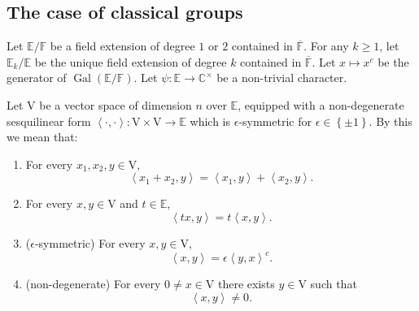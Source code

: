 \documentclass[12pt, reqno]{amsart}
\theoremstyle{definition}
\theoremstyle{definition}
\theoremstyle{definition}
\newcommand{\cComplex}{\mathbb{C}}
\newcommand{\multiplicativegroup}[1]{#1^{\times}}
\newcommand{\hermitianSpace}{\mathrm{V}}
\newcommand{\innerproduct}[2]{\left\langle #1,#2\right\rangle}
\newcommand{\fieldCharacter}{\psi}
\newcommand{\involution}[1]{#1^{c}}
\newcommand{\finiteField}{\mathbb{F}}
\newcommand{\quadraticExtension}{\mathbb{E}}
\newcommand{\quadraticFieldExtension}[1]{\quadraticExtension_{#1}}
\newcommand{\algebraicClosure}[1]{\overline{#1}}
\newcommand{\Galois}{\operatorname{Gal}}
\begin{document}
\subsection{The case of classical groups}

Let $\quadraticExtension \slash \finiteField$ be a field extension of degree $1$ or $2$ contained in $\algebraicClosure{\finiteField}$. For any $k \ge 1$, let $\quadraticFieldExtension{k} \slash \quadraticExtension$ be the unique field extension of degree $k$ contained in $\algebraicClosure{\finiteField}$. Let $x \mapsto \involution{x}$ be the generator of $\Galois\left(\quadraticExtension \slash \finiteField\right)$. Let $\fieldCharacter \colon \quadraticExtension \to \multiplicativegroup{\cComplex}$ be a non-trivial character.

Let $\hermitianSpace$ be a vector space of dimension $n$ over $\quadraticExtension$, equipped with a non-degenerate sesquilinear form $\innerproduct{\cdot}{\cdot} \colon \hermitianSpace \times \hermitianSpace \to \quadraticExtension$ which is $\epsilon$-symmetric for $\epsilon \in \left\{\pm 1\right\}$. By this we mean that:
\begin{enumerate}
	\item For every $x_1,x_2,y \in \hermitianSpace$, $$\innerproduct{x_1 + x_2}{y} = \innerproduct{x_1}{y} + \innerproduct{x_2}{y}.$$
	\item For every $x,y \in \hermitianSpace$ and $t \in \quadraticExtension$, $$\innerproduct{tx}{y} = t\innerproduct{x}{y}.$$
	\item ($\epsilon$-symmetric) For every $x,y \in \hermitianSpace$, $$\innerproduct{x}{y} = \epsilon \involution{\innerproduct{y}{x}}.$$
	\item (non-degenerate) For every $0 \ne x \in \hermitianSpace$ there exists $y \in \hermitianSpace$ such that $$\innerproduct{x}{y} \ne 0.$$
\end{enumerate}
\end{document}
